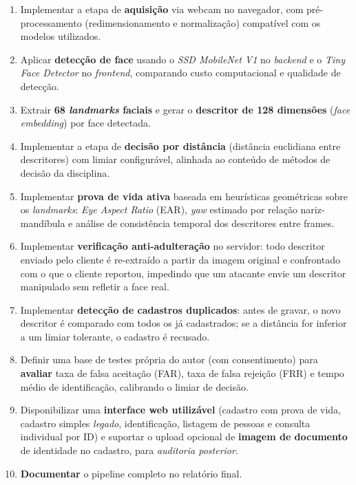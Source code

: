 \documentclass[12pt,a4paper]{article}
\begin{document}
\begin{enumerate}[leftmargin=*]
    \item Implementar a etapa de \textbf{aquisi\c{c}\~ao} via webcam no navegador, com
    pr\'e-processamento (redimensionamento e normaliza\c{c}\~ao) compat\'ivel com os modelos
    utilizados.

    \item Aplicar \textbf{detec\c{c}\~ao de face} usando o \emph{SSD MobileNet V1} no \emph{backend}
    e o \emph{Tiny Face Detector} no \emph{frontend}, comparando custo computacional e qualidade
    de detec\c{c}\~ao.

    \item Extrair \textbf{68 \emph{landmarks} faciais} e gerar o \textbf{descritor de 128 dimens\~oes}
    (\emph{face embedding}) por face detectada.

    \item Implementar a etapa de \textbf{decis\~ao por dist\^ancia} (dist\^ancia
    euclidiana entre descritores) com limiar configur\'avel, alinhada ao conte\'udo
    de m\'etodos de decis\~ao da disciplina.

    \item Implementar \textbf{prova de vida ativa} baseada em heur\'isticas geom\'etricas
    sobre os \emph{landmarks}: \emph{Eye Aspect Ratio} (EAR), \emph{yaw} estimado por
    rela\c{c}\~ao nariz-mand\'ibula e an\'alise de consist\^encia temporal dos descritores
    entre frames.

    \item Implementar \textbf{verifica\c{c}\~ao anti-adultera\c{c}\~ao} no servidor:
    todo descritor enviado pelo cliente \'e re-extra\'ido a partir da imagem original e
    confrontado com o que o cliente reportou, impedindo que um atacante envie um
    descritor manipulado sem refletir a face real.

    \item Implementar \textbf{detec\c{c}\~ao de cadastros duplicados}: antes de gravar,
    o novo descritor \'e comparado com todos os j\'a cadastrados; se a dist\^ancia
    for inferior a um limiar tolerante, o cadastro \'e recusado.

    \item Definir uma base de testes pr\'opria do autor (com consentimento)
    para \textbf{avaliar} taxa de falsa aceita\c{c}\~ao (FAR), taxa de falsa rejei\c{c}\~ao
    (FRR) e tempo m\'edio de identifica\c{c}\~ao, calibrando o limiar de decis\~ao.

    \item Disponibilizar uma \textbf{interface web utiliz\'avel} (cadastro com
    prova de vida, cadastro simples \emph{legado}, identifica\c{c}\~ao, listagem
    de pessoas e consulta individual por ID) e suportar o upload opcional de
    \textbf{imagem de documento} de identidade no cadastro, para \emph{auditoria
    posterior}.

    \item \textbf{Documentar} o pipeline completo no relat\'orio final.
\end{enumerate}
\end{document}
